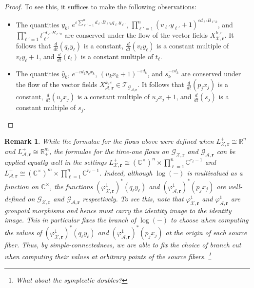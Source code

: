 \documentclass{amsart}
\newtheorem{remark}[theorem]{Remark}
\numberwithin{equation}{section}
\newcommand{\bfr}{{\boldsymbol{r}}}
\newcommand{\cA}{\mathcal{A}}
\newcommand{\cG}{\mathcal{G}}
\newcommand{\cT}{\mathcal{T}}
\newcommand{\cX}{\mathcal{X}}
\newcommand{\CC}{\mathbb{C}}
\newcommand{\RR}{\mathbb{R}}
\begin{document}
\begin{proof}
  To see this, it suffices to make the following observations:
  \begin{itemize}
    \item The quantities $y_k$, $e^{\varepsilon\sum_{\ell'=1}^n d_{\ell'} B_{\ell' k}q_{\ell'} y_{\ell'}}$, $\prod_{\ell'=1}^n (v_{\ell'}y_{\ell'}+1)^{\varepsilon d_{\ell'} B_{\ell' k}}$, and $\prod_{\ell'=1}^nt_{\ell'}^{\varepsilon d_{\ell'} B_{\ell' k}}$ are conserved under the flow of the vector fields $X_{\cX,\bfr}^{k,\varepsilon}$.
      It follows that $\frac{d}{dt}(q_\ell y_\ell)$ is a constant, $\frac{d}{dt}(v_\ell y_\ell)$ is a constant multiple of $v_\ell y_\ell+1$, and $\frac{d}{dt}(t_\ell)$ is a constant multiple of $t_\ell$.
    \item The quantities $\hat y_k$, $e^{-\varepsilon d_kp_kx_k}$, $(u_kx_k+1)^{-\varepsilon d_k}$, and $s_k^{-\varepsilon d_k}$ are conserved under the flow of the vector fields $X_{\cA,\bfr}^{k,\varepsilon}\in\cT_{\cG_{\cA,\bfr}}$.
      It follows that $\frac{d}{dt}(p_jx_j)$ is a constant, $\frac{d}{dt}(u_j x_j)$ is a constant multiple of $u_j x_j+1$, and $\frac{d}{dt}(s_j)$ is a constant multiple of $s_j$.
  \end{itemize}
\end{proof}
\begin{remark}
  While the formulae for the flows above were defined when $L^+_{\cX,\bfr}\cong\RR_+^n$ and $L^+_{\cA,\bfr}\cong\RR_+^m$, the formulae for the time-one flows on $\cG_{\cX,\bfr}$ and $\cG_{\cA,\bfr}$ can be applied equally well in the settings $L^+_{\cX,\bfr}\cong(\CC^\times)^n\times\prod_{\ell=1}^n \CC^{r_\ell-1}$ and $L^+_{\cA,\bfr}\cong(\CC^\times)^m\times\prod_{\ell=1}^n \CC^{r_\ell-1}$.
  Indeed, although $\log(-)$ is multivalued as a function on $\CC^\times$, the functions $(\varphi_{\cX,\bfr}^1)^*(q_\ell y_\ell)$ and $(\varphi_{\cA,\bfr}^1)^*(p_jx_j)$ are well-defined on $\cG_{\cX,\bfr}$ and $\cG_{\cA,\bfr}$ respectively.
  To see this, note that $\varphi_{\cX,\bfr}^1$ and $\varphi_{\cA,\bfr}^1$ are groupoid morphisms and hence must carry the identity image to the identity image.
  This in particular fixes the branch of $\log(-)$ to choose when computing the values of $(\varphi_{\cX,\bfr}^1)^*(q_\ell y_\ell)$ and $(\varphi_{\cA,\bfr}^1)^*(p_jx_j)$ at the origin of each source fiber.
  Thus, by simple-connectedness, we are able to fix the choice of branch cut when computing their values at arbitrary points of the source fibers. 
  \footnote{What about the symplectic doubles?}
\end{remark}
\end{document}
